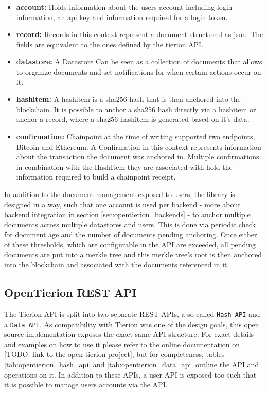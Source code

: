 \documentclass[12pt,msc,a4paper,oneside]{ucl_thesis}
\begin{document}
\begin{itemize}
    \item \textbf{account:} Holds information about the users account including login information, an api key and information required for a login token.

    \item \textbf{record:} Records in this context represent a document structured as json. The fields are equivalent to the ones defined by the tierion API.

    \item \textbf{datastore:} A Datastore Can be seen as a collection of documents that allows to organize documents and set notifications for when certain actions occur on it.

    \item \textbf{hashitem:} A hashitem is a sha256 hash that is then anchored into the blockchain. It is possible to anchor a sha256 hash directly via a hashitem or anchor a record, where a sha256 hashitem is generated based on it's data.

    \item \textbf{confirmation:} Chainpoint at the time of writing supported two endpoints, Bitcoin and Ethereum. A Confirmation in this context represents information about the transaction the document was anchored in. Multiple confirmations in combination with the HashItem they are associated with hold the information required to build a chainpoint receipt.
\end{itemize}
In addition to the document management exposed to users, the library is designed in a way, such that one account is used per backend - more about backend integration in section \ref{sec:opentierion_backends} - to anchor multiple documents across multiple datastores and users. This is done via periodic check for document age and the number of documents pending anchoring. Once either of these thresholds, which are configurable in the API are exceeded, all pending documents are put into a merkle tree and this merkle tree's root is then anchored into the blockchain and associated with the documents referenced in it.

\subsection{OpenTierion REST API} \label{sec:opentierion_rest_api}
The Tierion API is split into two separate REST APIs, a so called \texttt{Hash API} and a \texttt{Data API}. As compatibility with Tierion was one of the design goals, this open source implementation exposes the exact same API structure. For exact details and examples on how to use it please refer to the online documentation on [TODO: link to the open tierion project], but for completeness, tables \ref{tab:opentierion_hash_api} and \ref{tab:opentierion_data_api} outline the API and operations on it. In addition to these APIs, a user API is exposed too such that it is possible to manage users accounts via the API.
\end{document}
